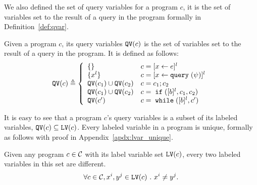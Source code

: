%
We also defined the set of query variables for a program $c$,
it is the set of variables set to the result of a query in the program formally in Definition~\ref{def:qvar}.
\begin{defn} 
  \label{def:qvar}
Given a program $c$, its query variables 
$\mathtt{QV}(c)$ is the set of variables set to the result of a query in the program.
It is defined as follows:
{\footnotesize
$$
  \qvar(c) \triangleq
  \left\{
  \begin{array}{ll}
      \{\}                  
      & {c} = [{\assign x \expr}]^{l} 
      \\
      \{{x}^l\}                  
      & {c} = [{\assign x \query(\qexpr)}]^{l} 
      \\
      \qvar(c_1) \cup \qvar(c_2)  
      & {c} = {c_1};{c_2}
      \\
      \qvar(c_1) \cup \qvar(c_2) 
      & {c} =\eif([\bexpr]^{l}, c_1, c_2) 
      \\
      \qvar(c')
      & {c}   = \ewhile ([\bexpr]^{l}, {c}')
\end{array}
\right.
$$
}
\end{defn}
%
It is easy to see that a program $c$'s query variables is a subset of 
its labeled variables, $\mathtt{QV}(c) \subseteq \mathtt{LV}(c)$.
%
%
Every labeled variable in a program is unique, formally as follows with proof in Appendix~\ref{apdx:lvar_unique}.
\begin{lem}
  \label{lem:lvar_unique}
  Given any program $c \in \mathcal{C}$ with its label variable set $\mathtt{LV}(c)$,
  every two labeled variables in this set are different.
  \[
    \forall c \in \mathcal{C}, x^i, y^j \in \mathtt{LV}(c) ~.~ x^i \neq y^j.
    \]
\end{lem}


